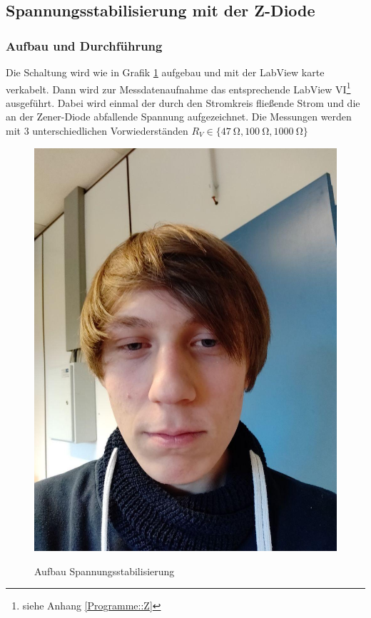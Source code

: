 \documentclass[12pt,twoside,a4paper]{scrartcl}
\begin{document}
	\subsection{Spannungsstabilisierung mit der Z-Diode}

		\subsubsection{Aufbau und Durchführung}

			Die Schaltung wird wie in Grafik \ref{Aufbau::Z} aufgebau und mit der LabView karte verkabelt. Dann wird zur Messdatenaufnahme das entsprechende LabView VI\footnote{siehe Anhang \ref{Programme::Z}} ausgeführt. Dabei wird einmal der durch den Stromkreis fließende Strom und die an der Zener-Diode abfallende Spannung aufgezeichnet. Die Messungen werden mit 3 unterschiedlichen Vorwiederständen $R_V \in \{ \SI{47}{\ohm}, \SI{100}{\ohm}, \SI{1000}{\ohm} \}$

			\begin{figure}[H]
				\centering

				\includegraphics[width = 0.8 \textwidth]{Pictures/Platzhalter}
				\label{Aufbau::Z}
				\caption{Aufbau Spannungsstabilisierung}
			\end{figure}
\end{document}
